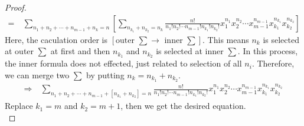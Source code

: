\begin{proof}
\begin{align*}
			=\ & \sum\limits_{n_1 + n_2 + \cdots + n_{m - 1} + n_k = n}\left[\sum\limits_{n_{k_1} + n_{k_2} = n_k}\frac{n!}{n_1!n_2!\cdots n_{m - 1}!n_{k_1}!n_{k_2}!}x_1^{n_1}x_2^{n_2}\cdots x_{m - 1}^{n_{m - 1}}x_{k_1}^{n_{k_1}}x_{k_2}^{n_{k_2}}\right]
		\end{align*}
		Here, the caculation order is $\left[\mbox{outer }\sum \rightarrow \mbox{ inner }\sum\right]$. This means $n_k$ is selected at outer $\sum$ at first and then $n_{k_1}$ and $n_{k_2}$ is selected at inner $\sum$. In this process, the inner formula does not effected, just related to selection of all $n_i$. Therefore, we can merge two $\sum$ by putting $n_k = n_{k_1} + n_{k_2}$.
		\begin{align*}
			\Rightarrow\ & \sum\limits_{n_1 + n_2 + \cdots + n_{m - 1} + [n_{k_1} + n_{k_2}] = n}\frac{n!}{n_1!n_2!\cdots n_{m - 1}!n_{k_1}!n_{k_2}!}x_1^{n_1}x_2^{n_2}\cdots x_{m - 1}^{n_{m - 1}}x_{k_1}^{n_{k_1}}x_{k_2}^{n_{k_2}}
		\end{align*}
		Replace $k_1 = m$ and $k_2 =  m + 1$, then we get the desired equation.\\
	\end{proof}